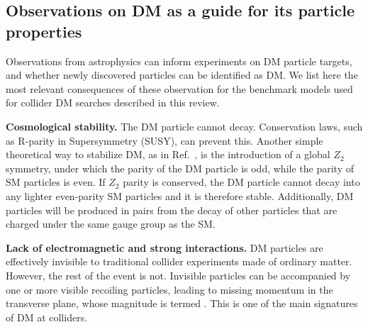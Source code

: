 \begin{textbox}[!h]
\section{Observations on DM as a guide for its particle properties}

Observations from astrophysics can inform experiments on DM particle targets, and whether newly discovered particles can be identified as DM. 
We list here the most relevant consequences of these observation for the benchmark models used for collider DM searches described in this review. 

\textbf{Cosmological stability.}
The DM particle cannot decay. Conservation laws, such as R-parity in Supersymmetry (SUSY), can prevent this. 
Another simple theoretical way to stabilize DM, as in Ref.~\cite{Batell:2010bp}, is the introduction of a global $Z_2$ symmetry, under which the parity of the DM particle is odd, while the parity of SM particles is even. If $Z_2$  parity is conserved, the DM particle cannot decay into any lighter even-parity SM particles and it is therefore stable. Additionally, DM particles will be produced in pairs from the decay of other particles that are charged under the same gauge group as the SM.

\textbf{Lack of electromagnetic and strong interactions.} 
DM particles are effectively invisible to traditional collider experiments made of ordinary matter. However, the rest of the event is not. 
Invisible particles can be accompanied by one or more visible recoiling particles, leading to missing momentum in the transverse plane, whose magnitude is termed \MET. 
This is one of the main signatures of DM at colliders.


\end{textbox}
